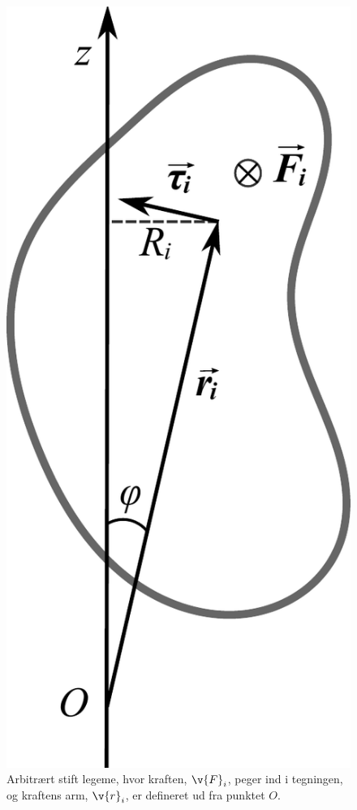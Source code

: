 \begin{figure}[]
\centering
\includegraphics[width=.4\textwidth]{Analytisk-Mekanik/N2}
\caption{Arbitrært stift legeme, hvor kraften, $\v{F}_i$, peger ind i tegningen, og kraftens arm, $\v{r}_i$, er defineret ud fra punktet $O$.}
\label{fig:Kraftmoment}
\end{figure}

